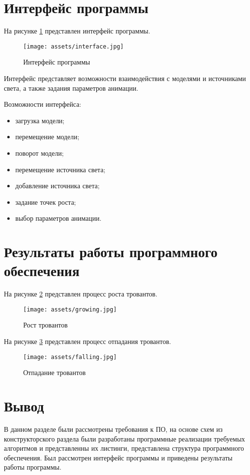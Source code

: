 \newpage

\section{Интерфейс программы}

На рисунке \ref{interface} представлен интерфейс программы.

\begin{figure}[h!]
	\begin{center}
		\texttt{[image: assets/interface.jpg]}
	\end{center}
	\caption{Интерфейс программы}
	\label{interface}
\end{figure}

Интерфейс представляет возможности взаимодействия с моделями и источниками света, а также задания параметров анимации.

Возможности интерфейса:
\begin{itemize}
	\item загрузка модели;
	\item перемещение модели;
	\item поворот модели;
	\item перемещение источника света;
	\item добавление источника света;
	\item задание точек роста;
	\item выбор параметров анимации.
\end{itemize}

\section{Результаты работы программного обеспечения}

На рисунке \ref{growing} представлен процесс роста тровантов.

\begin{figure}[h!]
	\begin{center}
		\texttt{[image: assets/growing.jpg]}
	\end{center}
	\caption{Рост тровантов}
	\label{growing}
\end{figure}

На рисунке \ref{falling} представлен процесс отпадания тровантов.

\begin{figure}[h!]
	\begin{center}
		\texttt{[image: assets/falling.jpg]}
	\end{center}
	\caption{Отпадание тровантов}
	\label{falling}
\end{figure}

\section*{Вывод}
В данном разделе были рассмотрены требования к ПО, на основе схем из конструкторского раздела были разработаны программные реализации требуемых алгоритмов и представленны их листинги, представлена структура программного обеспечения. Был рассмотрен интерфейс программы и приведены результаты работы программы.